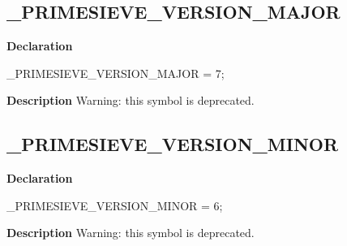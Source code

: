 \documentclass{report}
\newif\ifpdf
\begin{document}
\subsection*{{\_}PRIMESIEVE{\_}VERSION{\_}MAJOR}
\fi
\label{primesieve-_PRIMESIEVE_VERSION_MAJOR}
\begin{list}{}{
\setlength{\itemindent}{0cm}
\setlength{\listparindent}{0cm}
\setlength{\leftmargin}{\evensidemargin}
\addtolength{\leftmargin}{\tmplength}
\settowidth{\labelsep}{X}
\addtolength{\leftmargin}{\labelsep}
\setlength{\labelwidth}{\tmplength}
}
\item[\textbf{Declaration}\hfill]
\ifpdf
\begin{flushleft}
\fi
\begin{ttfamily}
{\_}PRIMESIEVE{\_}VERSION{\_}MAJOR = 7;\end{ttfamily}

\ifpdf
\end{flushleft}
\fi

\par
\item[\textbf{Description}]
Warning: this symbol is deprecated.

 

\end{list}
\ifpdf
\subsection*{\large{\textbf{{\_}PRIMESIEVE{\_}VERSION{\_}MINOR}}\normalsize\hspace{1ex}\hrulefill}
\else
\subsection*{{\_}PRIMESIEVE{\_}VERSION{\_}MINOR}
\fi
\label{primesieve-_PRIMESIEVE_VERSION_MINOR}
\begin{list}{}{
\setlength{\itemindent}{0cm}
\setlength{\listparindent}{0cm}
\setlength{\leftmargin}{\evensidemargin}
\addtolength{\leftmargin}{\tmplength}
\settowidth{\labelsep}{X}
\addtolength{\leftmargin}{\labelsep}
\setlength{\labelwidth}{\tmplength}
}
\item[\textbf{Declaration}\hfill]
\ifpdf
\begin{flushleft}
\fi
\begin{ttfamily}
{\_}PRIMESIEVE{\_}VERSION{\_}MINOR = 6;\end{ttfamily}

\ifpdf
\end{flushleft}
\fi

\par
\item[\textbf{Description}]
Warning: this symbol is deprecated.

 

\end{list}
\ifpdf
\end{document}
